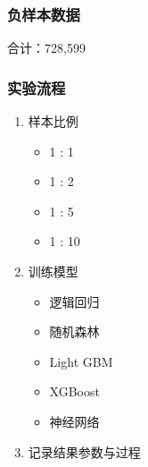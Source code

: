 \documentclass[UTF8,aspectratio=1610,10pt]{ctexbeamer}
\begin{document}
\begin{frame}
\frametitle{负样本数据}
合计：728,599
\end{frame}

\begin{frame}
\frametitle{实验流程}
\begin{enumerate}
  \item 样本比例
	\begin{itemize}
	  \item 1 : 1
	  \item 1 : 2
	  \item 1 : 5
	  \item 1 : 10
	\end{itemize}
  \item 训练模型
	  \begin{itemize}
		  \item 逻辑回归
		  \item 随机森林
		  \item Light GBM
		  \item XGBoost
		  \item 神经网络
		\end{itemize}
  \item 记录结果参数与过程
\end{enumerate}

\end{frame}
\end{document}
